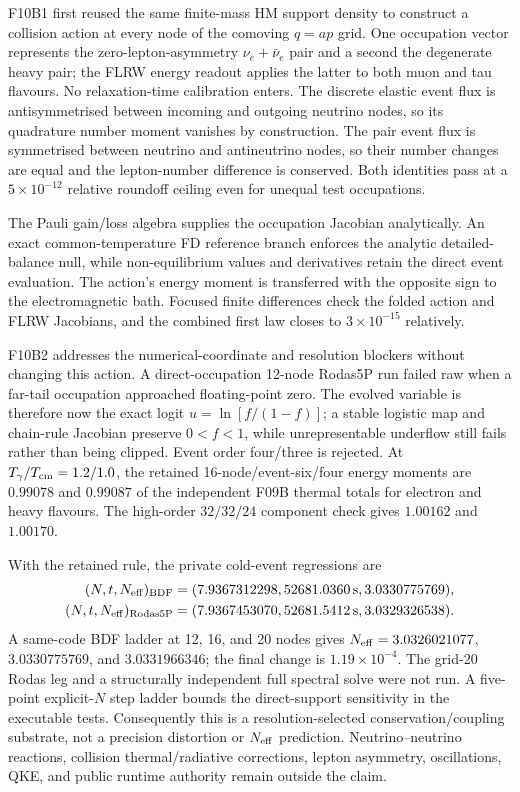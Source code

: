 F10B1 first reused the same finite-mass HM support density to construct a collision
action at every node of the comoving $q=ap$ grid.  One occupation vector
represents the zero-lepton-asymmetry $\nu_e+\bar\nu_e$ pair and a second the
degenerate heavy pair; the FLRW energy readout applies the latter to both muon
and tau flavours.  No relaxation-time calibration enters.  The discrete
elastic event flux is antisymmetrised between incoming and outgoing neutrino
nodes, so its quadrature number moment vanishes by construction.  The pair
event flux is symmetrised between neutrino and antineutrino nodes, so their
number changes are equal and the lepton-number difference is conserved.  Both
identities pass at a $5\times10^{-12}$ relative roundoff ceiling even for
unequal test occupations.

The Pauli gain/loss algebra supplies the occupation Jacobian analytically.  An
exact common-temperature FD reference branch enforces the analytic detailed-
balance null, while non-equilibrium values and derivatives retain the direct
event evaluation.  The action's energy moment is transferred with the opposite
sign to the electromagnetic bath.  Focused finite differences check the
folded action and FLRW Jacobians, and the combined first law closes to
$3\times10^{-15}$ relatively.

F10B2 addresses the numerical-coordinate and resolution blockers without
changing this action.  A direct-occupation 12-node Rodas5P run failed raw when
a far-tail occupation approached floating-point zero.  The evolved variable
is therefore now the exact logit $u=\ln[f/(1-f)]$; a stable logistic map and
chain-rule Jacobian preserve $0<f<1$, while unrepresentable underflow still
fails rather than being clipped.  Event order four/three is rejected.  At
$T_\gamma/T_{\rm cm}=1.2/1.0$, the retained 16-node/event-six/four energy
moments are $0.99078$ and $0.99087$ of the independent F09B thermal totals for
electron and heavy flavours.  The high-order $32/32/24$ component check gives
$1.00162$ and $1.00170$.

With the retained rule, the private cold-event regressions are
\begin{align*}
(N,t,N_{\rm eff})_{\rm BDF}
  &= (7.9367312298,52681.0360\,\mathrm{s},3.0330775769),\\
(N,t,N_{\rm eff})_{\rm Rodas5P}
  &= (7.9367453070,52681.5412\,\mathrm{s},3.0329326538).
\end{align*}
A same-code BDF ladder at 12, 16, and 20 nodes gives
$N_{\rm eff}=3.0326021077$, $3.0330775769$, and $3.0331966346$; the final change is
$1.19\times10^{-4}$.  The grid-20 Rodas leg and a structurally independent
full spectral solve were not run.  A five-point explicit-$N$ step ladder bounds
the direct-support sensitivity in the executable tests.  Consequently this is
a resolution-selected conservation/coupling substrate, not a precision
distortion or $N_{\rm eff}$ prediction.  Neutrino--neutrino reactions, collision
thermal/radiative corrections, lepton asymmetry, oscillations, QKE, and public
runtime authority remain outside the claim.

